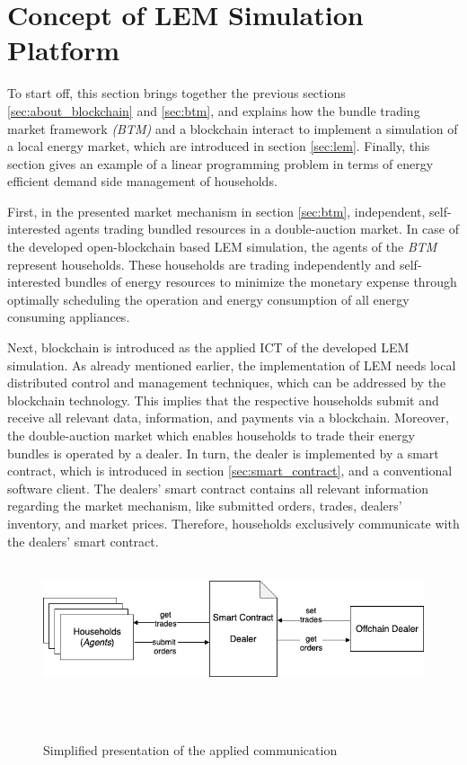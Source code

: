 \section{Concept of LEM Simulation Platform}
\label{sec:concept_of_lem}
To start off, this section brings together the previous sections \ref{sec:about_blockchain} and \ref{sec:btm},
and explains how the bundle trading market framework \textit{(BTM)} and a blockchain interact to implement a simulation 
of a local energy market, which are introduced in section \ref{sec:lem}.
Finally, this section gives an example of a linear programming problem in terms of energy efficient demand side management of households. 

First, in the presented market mechanism in section \ref{sec:btm}, independent, self-interested agents trading bundled resources
in a double-auction market. 
In case of the developed open-blockchain based LEM simulation, the agents of the \textit{BTM} represent households. 
These households are trading independently and self-interested bundles of energy resources 
to minimize the monetary expense through optimally scheduling the operation and energy consumption 
of all energy consuming appliances.

Next, blockchain is introduced as the applied ICT of the developed LEM simulation. 
As already mentioned earlier, the implementation of LEM needs 
local distributed control and management techniques, which can be addressed by the blockchain technology.
This implies that the respective households submit and receive all relevant data, information, and payments via a blockchain. 
Moreover, the double-auction market which enables households to trade their energy bundles is operated by a dealer.
In turn, the dealer is implemented by a smart contract, which is introduced in section \ref{sec:smart_contract}, and a conventional software client. 
The dealers' smart contract contains all relevant information regarding the market mechanism, like submitted orders, trades, 
dealers' inventory, and market prices. 
Therefore, households exclusively communicate with the dealers' smart contract. 

\begin{figure}[htbp]
    \centering
    \includegraphics[width=.7\linewidth]{./figures/concept_lem.png}
    \caption{Simplified presentation of the applied communication}
    \label{figure:concept_lem}
\end{figure}

